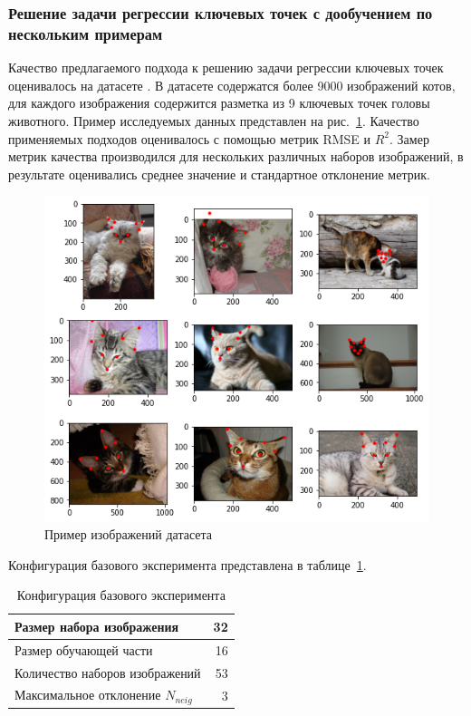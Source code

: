 \documentclass[a4paper,14pt]{article}
\begin{document}
    \subsubsection{Решение задачи регрессии ключевых точек с дообучением по нескольким примерам} \label{kpoints_exp}

    Качество предлагаемого подхода к решению задачи регрессии ключевых точек оценивалось на датасете \cite{cat_dataset}.
    В датасете содержатся более 9000 изображений котов, для каждого изображения содержится разметка из 9 ключевых точек головы животного.
    Пример исследуемых данных представлен на рис.~\ref{fig:example_cat_dataset}.
    Качество применяемых подходов оценивалось с помощью метрик RMSE и $R^2$.
    Замер метрик качества производился для нескольких различных наборов изображений, в результате оценивались среднее значение и стандартное отклонение метрик.

    \begin{figure}[H]
        \centering
        \includegraphics[width=0.6\linewidth]{images/example_cat_dataset}
        \caption{Пример изображений датасета \cite{cat_dataset}}
        \label{fig:example_cat_dataset}
    \end{figure}

    Конфигурация базового эксперимента представлена в таблице~\ref{tab:base_config}.
    \begin{center}
        \begin{table}[H]
            \centering
            \caption{Конфигурация базового эксперимента}
            \label{tab:base_config}
            \bgroup
            \def\arraystretch{1.5}
            \begin{tabular}{| l | r |}
                \hline
                Размер набора изображения         & 32 \\ \hline
                Размер обучающей части            & 16 \\ \hline
                Количество наборов изображений    & 53 \\ \hline
                Максимальное отклонение  $N_{neig}$ & 3  \\
                \hline
            \end{tabular}
            \egroup
        \end{table}
    \end{center}
\end{document}
